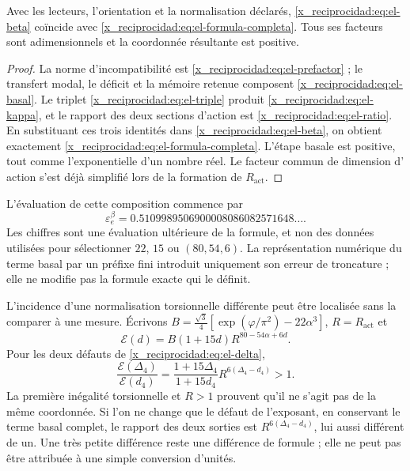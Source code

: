 \begin{theorem}
Avec les lecteurs, l'orientation et la normalisation déclarés,
\eqref{x_reciprocidad:eq:el-beta} coïncide avec \eqref{x_reciprocidad:eq:el-formula-completa}. Tous
ses facteurs sont adimensionnels et la coordonnée résultante est positive.
\end{theorem}
\begin{proof}
La norme d'incompatibilité est \eqref{x_reciprocidad:eq:el-prefactor} ; le transfert modal,
le déficit et la mémoire retenue composent \eqref{x_reciprocidad:eq:el-basal}. Le
triplet \eqref{x_reciprocidad:eq:el-triple} produit \eqref{x_reciprocidad:eq:el-kappa}, et le rapport des
deux sections d'action est \eqref{x_reciprocidad:eq:el-ratio}. En substituant ces
trois identités dans \eqref{x_reciprocidad:eq:el-beta}, on obtient exactement
\eqref{x_reciprocidad:eq:el-formula-completa}. L'étape basale est positive, tout comme
l'exponentielle d'un nombre réel. Le facteur commun de dimension d'
action s'est déjà simplifié lors de la formation de \(R_{\mathrm{act}}\).
\end{proof}

L'évaluation de cette composition commence par
\begin{equation}
 \varepsilon_e^\beta
 =0.5109989506900008086082571648\ldots.
 \label{x_reciprocidad:eq:el-beta-decimal}
\end{equation}
Les chiffres sont une évaluation ultérieure de la formule, et non des données utilisées
pour sélectionner \(22\), \(15\) ou \((80,54,6)\). La représentation
numérique du terme basal par un préfixe fini introduit uniquement son
erreur de troncature ; elle ne modifie pas la formule exacte qui le définit.

L'incidence d'une normalisation torsionnelle différente peut être localisée sans la comparer à une mesure. Écrivons \(B=\frac{\sqrt3}{4}[\exp(\varphi/\pi^2)-22\alpha^3]\), \(R=R_{\mathrm{act}}\) et
\[
 \mathcal E(d)=B(1+15d)R^{80-54\alpha+6d}.
\]
Pour les deux défauts de \eqref{x_reciprocidad:eq:el-delta},
\begin{equation}
 \frac{\mathcal E(\Delta_4)}{\mathcal E(d_4)}
 =\frac{1+15\Delta_4}{1+15d_4}
   R^{6(\Delta_4-d_4)}>1.
 \label{x_reciprocidad:eq:el-normalizacion-beta}
\end{equation}
La première inégalité torsionnelle et \(R>1\) prouvent qu'il ne s'agit pas de la même coordonnée. Si l'on ne change que le défaut de l'exposant, en conservant le terme basal complet, le rapport des deux sorties est \(R^{6(\Delta_4-d_4)}\), lui aussi différent de un. Une très petite différence reste une différence de formule ; elle ne peut pas être attribuée à une simple conversion d'unités.

